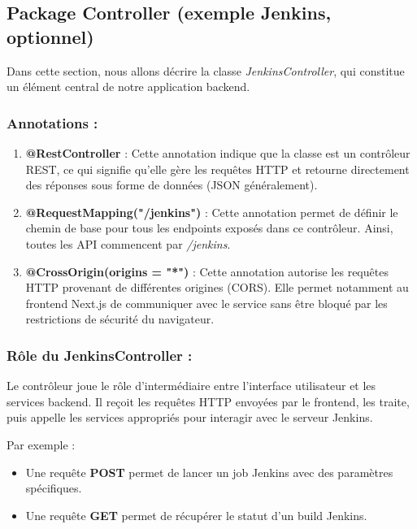 \subsection*{Package Controller (exemple Jenkins, optionnel)}

Dans cette section, nous allons décrire la classe \textit{JenkinsController}, qui constitue un élément central de notre application backend.

\subsubsection*{Annotations :}

\begin{enumerate}
    \item \textbf{@RestController} : Cette annotation indique que la classe est un contrôleur REST, ce qui signifie qu’elle gère les requêtes HTTP et retourne directement des réponses sous forme de données (JSON généralement).

    \item \textbf{@RequestMapping("/jenkins")} : Cette annotation permet de définir le chemin de base pour tous les endpoints exposés dans ce contrôleur. Ainsi, toutes les API commencent par \textit{/jenkins}.

    \item \textbf{@CrossOrigin(origins = "*")} : Cette annotation autorise les requêtes HTTP provenant de différentes origines (CORS). Elle permet notamment au frontend Next.js de communiquer avec le service sans être bloqué par les restrictions de sécurité du navigateur.
\end{enumerate}

\subsubsection*{Rôle du JenkinsController :}

Le contrôleur joue le rôle d’intermédiaire entre l’interface utilisateur et les services backend. Il reçoit les requêtes HTTP envoyées par le frontend, les traite, puis appelle les services appropriés pour interagir avec le serveur Jenkins.

Par exemple :
\begin{itemize}
    \item Une requête \textbf{POST} permet de lancer un job Jenkins avec des paramètres spécifiques.
    \item Une requête \textbf{GET} permet de récupérer le statut d’un build Jenkins.
\end{itemize}

